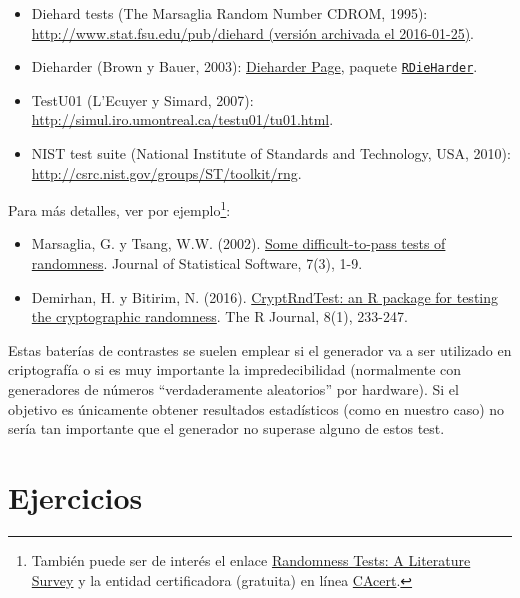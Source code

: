 \documentclass[
]{book}
\theoremstyle{break}
\theoremstyle{nonumberplain}
\begin{document}
\begin{itemize}
\item
  Diehard tests (The Marsaglia Random Number CDROM, 1995):
  \href{https://web.archive.org/web/20160125103112/http://stat.fsu.edu/pub/diehard}{http://www.stat.fsu.edu/pub/diehard (versión archivada el 2016-01-25)}.
\item
  Dieharder (Brown y Bauer, 2003):
  \href{https://webhome.phy.duke.edu/~rgb/General/dieharder.php}{Dieharder Page},
  paquete \href{https://github.com/eddelbuettel/rdieharder}{\texttt{RDieHarder}}.
\item
  TestU01 (L'Ecuyer y Simard, 2007):
  \url{http://simul.iro.umontreal.ca/testu01/tu01.html}.
\item
  NIST test suite (National Institute of Standards and Technology, USA, 2010):
  \url{http://csrc.nist.gov/groups/ST/toolkit/rng}.
\end{itemize}

Para más detalles, ver por ejemplo\footnote{También puede ser de interés el enlace \href{http://www.ciphersbyritter.com/RES/RANDTEST.HTM}{Randomness Tests: A Literature Survey} y la entidad certificadora (gratuita) en línea \href{http://www.cacert.at/random}{CAcert}.}:

\begin{itemize}
\item
  Marsaglia, G. y Tsang, W.W. (2002). \href{http://www.jstatsoft.org/v07/i03}{Some difficult-to-pass tests of randomness}. Journal of Statistical Software, 7(3), 1-9.
\item
  Demirhan, H. y Bitirim, N. (2016). \href{https://journal.r-project.org/archive/2016/RJ-2016-016/index.html}{CryptRndTest: an R package for testing the cryptographic randomness}. The R Journal, 8(1), 233-247.
\end{itemize}

Estas baterías de contrastes se suelen emplear si el generador va a ser utilizado en criptografía o si es muy importante la impredecibilidad (normalmente con generadores de números ``verdaderamente aleatorios'' por hardware).
Si el objetivo es únicamente obtener resultados estadísticos (como en nuestro caso) no sería tan importante que el generador no superase alguno de estos test.

\hypertarget{ejercicios-1}{%
\section{Ejercicios}\label{ejercicios-1}}
\end{document}
